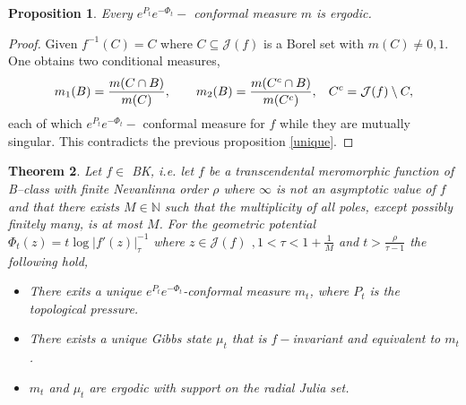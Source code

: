 \documentclass[12pt,reqno]{amsart}
\newtheorem{theorem}{Theorem}
\newtheorem{proposition}[theorem]{Proposition}
\begin{document}
\begin{proposition}\label{ergodic}
    Every $e^{P_t}e^{-\Phi_t}-$ conformal measure $m$ is ergodic.
\end{proposition}
\begin{proof}
    Given $f^{-1}(C)=C$ where $C \subseteq \mathcal{J}(f)$ is a Borel set with $m(C)\neq0,1$. One obtains two conditional measures,
    $$m_{1}(B)=\dfrac{m(C\cap B)}{m(C)},  \hspace{.7cm} m_{2}(B)=\dfrac{m(C^c\cap B)}{m(C^c)}, \hspace{.3cm} C^c=\mathcal{J}(f)\setminus C,$$
    each of which $e^{P_t}e^{-\Phi_t}-$ conformal measure for $f$ while they are mutually singular. This contradicts the previous proposition \ref{unique}.
\end{proof}
\begin{theorem}\label{main theorem}
    Let $f \in $ BK, i.e. let $f$ be a transcendental meromorphic function of B--class with finite Nevanlinna order $\rho$ where $\infty$ is not an asymptotic value of $f$ and that there exists $M \in \mathbb{N}$ such that the multiplicity of all poles, except possibly finitely many, is at most $M$. For the geometric potential $\Phi_t(z)=t\log |f'(z)|^{-1}_{\tau}$ where $z\in \mathcal{J}(f)$ $, 1<\tau<1+\frac{1}{M}$ and $t> \frac{\rho}{\tau -1}$ the following hold,
    \begin{itemize}
        \item[(a)] There exits a unique $e^{P_t}e^{-\Phi_t}$-conformal measure $m_t$, where $P_t$ is the topological pressure.
        \item[(b)] There exists a unique Gibbs state $\mu_t$ that is $f-$invariant and equivalent to $m_t$.
        \item[(c)] $m_t$ and $\mu_t$ are ergodic with support on the radial Julia set.  
    \end{itemize}
\end{theorem}
\end{document}
